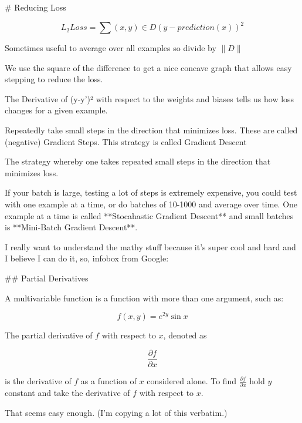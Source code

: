 \begin{markdown}
# Reducing Loss

\begin{equation}
    L_2Loss = \sum{(x,y) \in D} (y - prediction(x))^2
\end{equation}

Sometimes useful to average over all examples so divide by $\|D\|$

We use the square of the difference to get a nice concave graph that allows easy
stepping to reduce the loss.


The Derivative of (y-y')² with respect to the weights and biases tells us how
loss changes for a given example.

Repeatedly take small steps in the direction that minimizes loss. These are
called (negative) Gradient Steps. This strategy is called Gradient Descent

\begin{definition}
    The strategy whereby one takes repeated small steps in the direction that
    minimizes loss.
\end{definition}

If your batch is large, testing a lot of steps is extremely expensive, you could
test with one example at a time, or do batches of 10-1000 and average over time.
One example at a time is called **Stocahastic Gradient Descent** and small
batches is **Mini-Batch Gradient Descent**.

I really want to understand the mathy stuff because it's super cool and hard and
I believe I can do it, so, infobox from Google:

## Partial Derivatives

A multivariable function is a function with more than one argument, such as:

\begin{equation}
    f(x,y) = e^{2y}\sin{x}
\end{equation}

The partial derivative of $f$ with respect to $x$, denoted as

\begin{equation}
    \frac{\partial f}{\partial x}
\end{equation}

is the derivative of $f$ as a function of $x$ considered alone. To find
$\frac{\partial f}{\partial x}$ hold $y$ constant and take the derivative of $f$
with respect to $x$.

That seems easy enough. (I'm copying a lot of this verbatim.)


\end{markdown}
